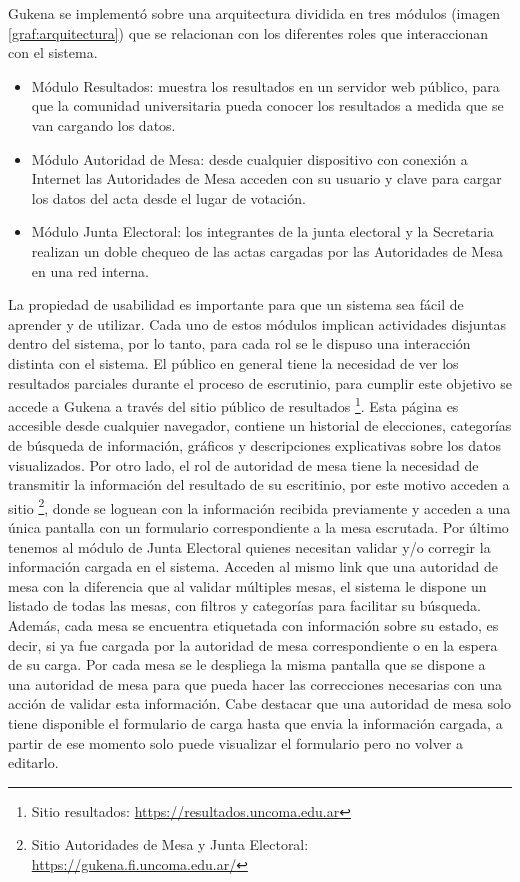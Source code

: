 Gukena se implementó sobre una arquitectura dividida en tres módulos (imagen \ref{graf:arquitectura}) que se relacionan con los diferentes roles que interaccionan con el sistema.
\begin{itemize}
\item Módulo Resultados: muestra los resultados en un servidor web público, para que la comunidad universitaria pueda conocer los resultados a medida que se van cargando los datos.
\item Módulo Autoridad de Mesa: desde cualquier dispositivo con conexión a Internet las Autoridades de Mesa acceden con su usuario y clave para cargar los datos del acta desde el lugar de votación.
\item Módulo Junta Electoral: los integrantes de la junta electoral y la Secretaria realizan un doble chequeo de las actas cargadas por las Autoridades de Mesa en una red interna.
\end{itemize}

La propiedad de usabilidad es importante para que un sistema sea fácil de aprender y de utilizar. Cada uno de estos módulos implican actividades disjuntas dentro del sistema, por lo tanto, para cada rol se le dispuso una interacción distinta con el sistema. \newline
El público en general tiene la necesidad de ver los resultados parciales durante el proceso de escrutinio, para cumplir este objetivo se accede a Gukena a través del sitio público de resultados \footnote{Sitio resultados: \url{https://resultados.uncoma.edu.ar}}.
Esta página es accesible desde cualquier navegador, contiene un historial de elecciones, categorías de búsqueda de información, gráficos y descripciones explicativas sobre los datos visualizados. Por otro lado, el rol de autoridad de mesa tiene la necesidad de transmitir la información del resultado de su escritinio, por este motivo acceden a sitio \footnote{Sitio Autoridades de Mesa y Junta Electoral: \url{https://gukena.fi.uncoma.edu.ar/}},
donde se loguean con la información recibida previamente y acceden a una única pantalla con un formulario correspondiente a la mesa escrutada. Por último tenemos al módulo de Junta Electoral quienes necesitan validar y/o corregir la información cargada en el sistema. Acceden al mismo link que una autoridad de mesa con la diferencia que al validar múltiples mesas, el sistema le dispone un listado de todas las mesas, con filtros y categorías para facilitar su búsqueda. Además, cada mesa se encuentra etiquetada con información sobre su estado, es decir, si ya fue cargada por la autoridad de mesa correspondiente o en la espera de su carga. Por cada mesa se le despliega la misma pantalla que se dispone a una autoridad de mesa para que pueda hacer las correcciones necesarias con una acción de validar esta información. Cabe destacar que una autoridad de mesa solo tiene disponible el formulario de carga hasta que envia la información cargada, a partir de ese momento solo puede visualizar el formulario pero no volver a editarlo.\newline


